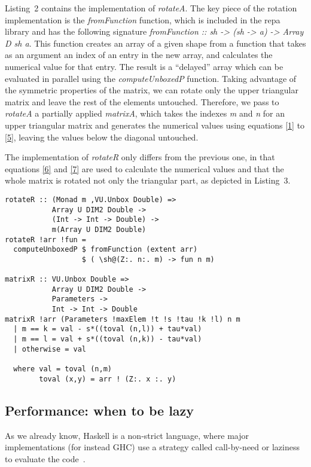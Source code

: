 \documentclass{tmr}
\begin{document}
Listing~2 contains the implementation of \textit{rotateA}.
%
The key piece of the rotation implementation is the
\textit{fromFunction} function, which is included in the repa library
and has the following signature 
\textit{fromFunction :: sh -> (sh -> a) -> Array D sh a}.
%
This function creates an array of a given shape from a function that
takes as an argument an index of an entry in the new array, and
calculates the numerical value for that entry.
%
The result is a ``delayed'' array which can be evaluated in parallel
using the \textit{computeUnboxedP} function.
%
Taking advantage of the symmetric properties of the matrix, we can
rotate only the upper triangular matrix and leave the rest of the elements untouched.
%
Therefore, we pass to \textit{rotateA} a partially applied
\textit{matrixA}, which takes the indexes \textit{m} and \textit{n} for
an upper triangular matrix and generates the numerical values using
equations \eqref{1} to \eqref{5}, leaving the values below the diagonal
untouched.

The implementation of \textit{rotateR} only differs from the previous
one, in that equations \eqref{6} and \eqref{7} are used to calculate the
numerical values and that the whole matrix is rotated not only the
triangular part, as depicted in Listing~3.

\begin{lstlisting}[float,captionpos=b,belowcaptionskip=4pt, caption= rotateR function]
rotateR :: (Monad m ,VU.Unbox Double) =>
           Array U DIM2 Double ->
           (Int -> Int -> Double) ->
           m(Array U DIM2 Double)
rotateR !arr !fun =
  computeUnboxedP $ fromFunction (extent arr)
                  $ ( \sh@(Z:. n:. m) -> fun n m)
        
matrixR :: VU.Unbox Double =>
           Array U DIM2 Double ->
           Parameters ->
           Int -> Int -> Double
matrixR !arr (Parameters !maxElem !t !s !tau !k !l) n m
  | m == k = val - s*((toval (n,l)) + tau*val)
  | m == l = val + s*((toval (n,k)) - tau*val)
  | otherwise = val

  where val = toval (n,m)
        toval (x,y) = arr ! (Z:. x :. y)
\end{lstlisting}

\subsection{Performance: when to be lazy}

As we already know, Haskell is a non-strict language, where major implementations (for instead GHC)
use a strategy called call-by-need or laziness to evaluate the code~\cite{Laziness}. 
\end{document}
